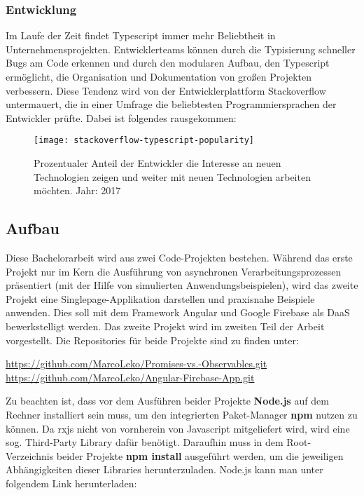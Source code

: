 \subsubsection{Entwicklung}
Im Laufe der Zeit findet Typescript immer mehr Beliebtheit in Unternehmensprojekten. Entwicklerteams können durch die Typisierung schneller Bugs am Code erkennen und durch den modularen Aufbau, den Typescript ermöglicht, die Organisation und Dokumentation von großen Projekten verbessern. Diese Tendenz wird von der Entwicklerplattform Stackoverflow untermauert, die in einer Umfrage die beliebtesten Programmiersprachen der Entwickler prüfte.
Dabei ist folgendes rausgekommen:

\begin{figure}[H]
\centering
\texttt{[image: stackoverflow-typescript-popularity]}
\caption{Prozentualer Anteil der Entwickler die Interesse an neuen Technologien zeigen und weiter mit neuen Technologien arbeiten möchten. Jahr: 2017 \cite{typescript-survey}}
\end{figure}

\subsection{Aufbau}
Diese Bachelorarbeit wird aus zwei Code-Projekten bestehen. Während das erste Projekt nur im Kern die Ausführung von asynchronen Verarbeitungsprozessen präsentiert (mit der Hilfe von simulierten Anwendungsbeispielen), wird das zweite Projekt eine Singlepage-Applikation darstellen und praxisnahe Beispiele anwenden. Dies soll mit dem Framework Angular und Google Firebase als DaaS bewerkstelligt werden. Das zweite Projekt wird im zweiten Teil der Arbeit vorgestellt. Die Repositories für beide Projekte sind zu finden unter: 

\begin{center}
\url{https://github.com/MarcoLeko/Promises-vs.-Observables.git} \\
\url{https://github.com/MarcoLeko/Angular-Firebase-App.git}
\end{center}

\noindent
Zu beachten ist, dass vor dem Ausführen beider Projekte \textbf{Node.js} auf dem Rechner installiert sein muss, um den integrierten Paket-Manager \textbf{npm} nutzen zu können. Da rxjs nicht von vornherein von Javascript mitgeliefert wird, wird eine sog. \glqq  Third-Party Library\grqq{} dafür benötigt. Daraufhin muss in dem Root-Verzeichnis beider Projekte \textbf{npm install} ausgeführt werden, um die jeweiligen Abhängigkeiten dieser Libraries herunterzuladen. Node.js kann man unter folgendem Link herunterladen:

